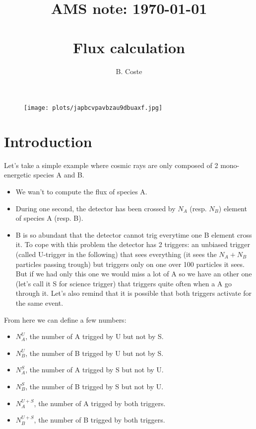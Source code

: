 \documentclass[fleqn,twoside]{article}
\begin{document}
\title{
  AMS note: \today \\
  \hspace{1cm} \\
  Flux calculation
}

\author{
  B. Coste\address[Trento]{INFN, Istituto Nazionale di Fisica Nucleare, Trento, Italia}
}

\maketitle

\begin{figure}[htb]
  \centering
  \texttt{[image: plots/japbcvpavbzau9dbuaxf.jpg]}
\end{figure}


\section{Introduction}
Let's take a simple example where cosmic rays are only composed of 2 mono-energetic species A and B.
\begin{itemize}
\item We wan't to compute the flux of species A.
\item During one second, the detector has been crossed by $N_{A}$ (resp. $N_{B}$) element of species A (resp. B).
\item B is so abundant that the detector cannot trig everytime one B element cross it. To cope with this problem the detector has 2 triggers:
  an unbiased trigger (called U-trigger in the following) that sees everything (it sees the $N_{A}+N_{B}$ particles passing trough) but triggers only on one over 100 particles it sees. But if we had only this one we would miss a lot of A so we have an other one (let's call it S for science trigger) that triggers quite often when a A go through it. Let's also remind that it is possible that both triggers activate for the same event.
\end{itemize}

From here we can define a few numbers:
\begin{itemize}
\item $N_{A}^{U}$, the number of A trigged by U but not by S.
\item $N_{B}^{U}$, the number of B trigged by U but not by S.
\item $N_{A}^{S}$, the number of A trigged by S but not by U.
\item $N_{B}^{S}$, the number of B trigged by S but not by U.
\item $N_{A}^{U+S}$, the number of A trigged by both triggers.
\item $N_{B}^{U+S}$, the number of B trigged by both triggers.
\end{itemize}
\end{document}
